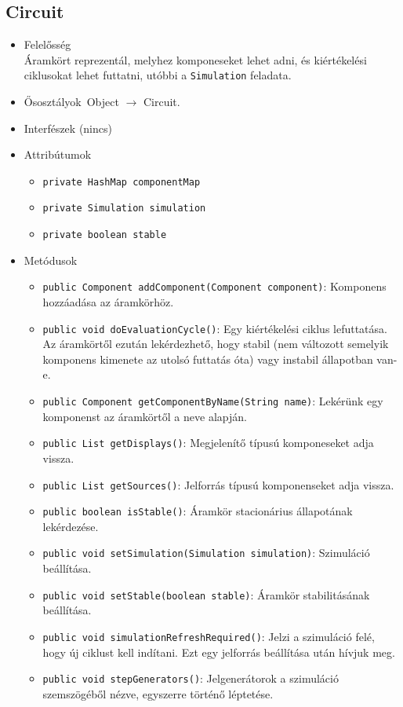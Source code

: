 \subsection{Circuit}
\begin{itemize}
\item Felelősség\\
Áramkört reprezentál, melyhez komponeseket lehet adni, és kiértékelési ciklusokat  lehet futtatni, utóbbi a \texttt{Simulation} feladata.
\item Ősosztályok\ Object $\rightarrow{}$ Circuit.
\item Interfészek (nincs)
\item Attribútumok $\ $
\begin{itemize}
	\item \texttt{private HashMap componentMap} 
	\item \texttt{private Simulation simulation} 
	\item \texttt{private boolean stable} 
\end{itemize}
\item Metódusok$\ $
\begin{itemize}
	\item \texttt{public Component addComponent(Component component)}: Komponens hozzáadása az áramkörhöz.
	\item \texttt{public void doEvaluationCycle()}: Egy kiértékelési ciklus lefuttatása. Az áramkörtől ezután lekérdezhető, hogy  stabil (nem változott semelyik komponens kimenete az utolsó futtatás óta)  vagy instabil állapotban van-e.
	\item \texttt{public Component getComponentByName(String name)}: Lekérünk egy komponenst az áramkörtől a neve alapján.
	\item \texttt{public List getDisplays()}: Megjelenítő típusú komponeseket adja vissza.
	\item \texttt{public List getSources()}: Jelforrás típusú komponenseket adja vissza.
	\item \texttt{public boolean isStable()}: Áramkör stacionárius állapotának lekérdezése.
	\item \texttt{public void setSimulation(Simulation simulation)}: Szimuláció beállítása.
	\item \texttt{public void setStable(boolean stable)}: Áramkör stabilitásának beállítása.
	\item \texttt{public void simulationRefreshRequired()}: Jelzi a szimuláció felé, hogy új ciklust kell indítani. Ezt egy jelforrás  beállítása után hívjuk meg.
	\item \texttt{public void stepGenerators()}: Jelgenerátorok a szimuláció szemszögéből nézve, egyszerre történő  léptetése.
\end{itemize}
\end{itemize}


